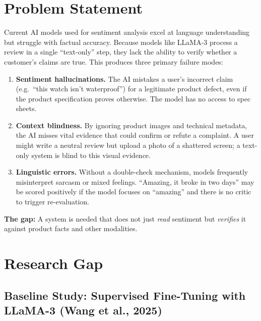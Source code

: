 \documentclass[12pt,a4paper]{article}
\begin{document}
\section{Problem Statement}

Current AI models used for sentiment analysis excel at language understanding but struggle
with factual accuracy. Because models like LLaMA-3 process a review in a single
``text-only'' step, they lack the ability to verify whether a customer's claims are true. This
produces three primary failure modes:

\begin{enumerate}[leftmargin=*]
  \item \textbf{Sentiment hallucinations.} The AI mistakes a user's incorrect claim (e.g.\
    ``this watch isn't waterproof'') for a legitimate product defect, even if the product
    specification proves otherwise. The model has no access to spec sheets.

  \item \textbf{Context blindness.} By ignoring product images and technical metadata, the AI
    misses vital evidence that could confirm or refute a complaint. A user might write a
    neutral review but upload a photo of a shattered screen; a text-only system is blind to
    this visual evidence.

  \item \textbf{Linguistic errors.} Without a double-check mechanism, models frequently
    misinterpret sarcasm or mixed feelings. ``Amazing, it broke in two days'' may be scored
    positively if the model focuses on ``amazing'' and there is no critic to trigger
    re-evaluation.
\end{enumerate}

\noindent\textbf{The gap:} A system is needed that does not just \emph{read} sentiment but
\emph{verifies} it against product facts and other modalities.

\section{Research Gap}

\subsection{Baseline Study: Supervised Fine-Tuning with LLaMA-3 (Wang et al., 2025)}
\end{document}
